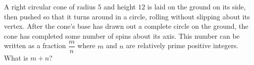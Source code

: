 A right circular cone of radius $5$ and height $12$ is laid on the ground on its side, then pushed so that it turns around in a circle, rolling without slipping about its vertex. After the cone's base has drawn out a complete circle on the ground, the cone has completed some number of spins about its axis. This number can be written as a fraction $\dfrac{m}{n}$ where $m$ and $n$ are relatively prime positive integers. What is $m + n$?
